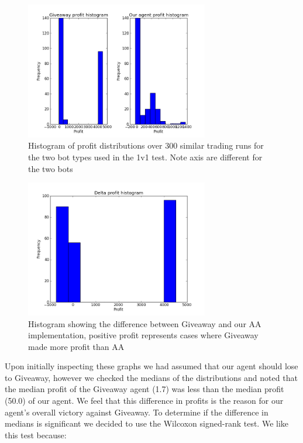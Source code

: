\documentclass{acm_proc_article-sp}
\begin{document}
\begin{figure}[h!] \includegraphics[width=80mm]{giveaway_1_v_1.png}
\caption{Histogram of profit distributions over 300 similar trading runs for
the two bot types used in the 1v1 test. Note axis are different for the two
bots} \end{figure}

\begin{figure}[h!] \includegraphics[width=80mm]{giveaway_1_v_1_delta.png}
\caption {Histogram showing the difference between Giveaway and our AA implementation,
positive profit represents cases where Giveaway made more profit than AA}
\end{figure}

\newpage
Upon initially inspecting these graphs we had assumed that our agent should
lose to Giveaway, however we checked the medians of the distributions and noted
that the median profit of the Giveaway agent (1.7) was less than the median
profit (50.0) of our agent. We feel that this difference in profits is the
reason for our agent's overall victory against Giveaway. To determine if the
difference in medians is significant we decided to use the Wilcoxon signed-rank
test\cite{wiki:wilcoxon}. We like this test because:
\end{document}
